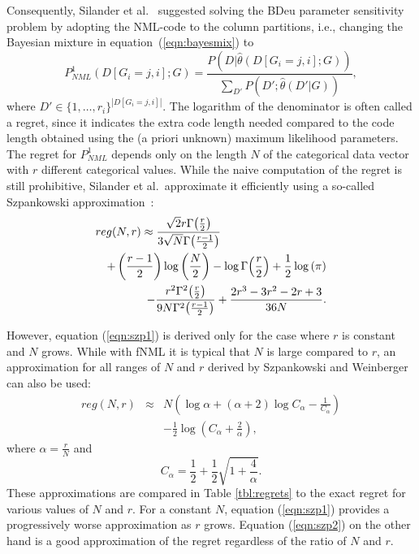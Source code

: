 Consequently, Silander et al.~\cite{cosco.pgm08a}
suggested solving the BDeu parameter sensitivity problem by adopting the
NML-code to the column partitions, i.e., changing the Bayesian mixture
in equation~(\ref{eqn:bayesmix}) to
\begin{equation}
P^1_{NML}(D[G_i=j,i];G)=\frac{P(D|\hat\theta(D[G_i=j,i];G))}{\sum_{D'}{P(D';\hat\theta(D'|G))}},
\end{equation}
where $D'\in{\{1,\ldots,r_i\}}^{|D[G_i=j,i]|}$.  The logarithm of the
denominator is often called a regret, since it indicates the extra
code length needed compared to the code length obtained using the (a
priori unknown) maximum likelihood parameters. The regret for
$P^1_{NML}$ depends only on the length $N$ of the categorical data
vector with $r$ different categorical values.  While the naive
computation of the regret is still prohibitive, Silander et al.\
approximate it efficiently using a so-called Szpankowski
approximation~\cite{cosco.aistat03}:
\begin{eqnarray}
\label{eqn:szp1}
\lefteqn{reg(N,r) \approx \frac{\sqrt{2} r \Gamma{\left(\frac{r}{2} \right)}}
                               {3 \sqrt{N} \Gamma{\left(\frac{r-1}{2}  \right)}}} \\
&&+ \left(\frac{r-1}{2}\right) \log{\left (\frac{N}{2} \right )}
- \log \Gamma{\left(\frac{r}{2} \right)} + \frac{1}{2} \log{\left (\pi \right )}\nonumber\\
&&- \frac{r^{2} \Gamma^{2}{\left(\frac{r }{2} \right)}}
         {9N \Gamma^{2}{\left(\frac{r-1}{2}\right)}}
+ \frac{2r^3-3r^2-2r+3}{36N}\nonumber.
\end{eqnarray}

However, equation (\ref{eqn:szp1}) is derived only for the case
where $r$ is constant and $N$ grows. While with
fNML it is typical that $N$ is large compared to $r$, an
approximation for all ranges of $N$ and $r$ derived by
Szpankowski and Weinberger~\cite{Szpankowski2012} can also be used:
\begin{eqnarray}
\label{eqn:szp2}
    reg(N, r) & \approx & N\left(\log{\alpha} + (\alpha + 2) \log{C_\alpha}
                - \frac{1}{C_\alpha}\right)\nonumber \\
    && - \frac{1}{2} \log{\left(C_\alpha + \frac{2}{\alpha}\right)},
\end{eqnarray}
where $\alpha = \frac{r}{N}$ and
\begin{equation}
    C_\alpha = \frac{1}{2} + \frac{1}{2} \sqrt{1 + \frac{4}{\alpha}}.
\end{equation}
These approximations are compared in Table \ref{tbl:regrets}
to the exact regret for various values of $N$ and $r$.
For a constant $N$, equation (\ref{eqn:szp1}) provides
a progressively worse approximation as $r$ grows. Equation
(\ref{eqn:szp2}) on the other hand is a good approximation of
the regret regardless of the ratio of $N$ and $r$.

